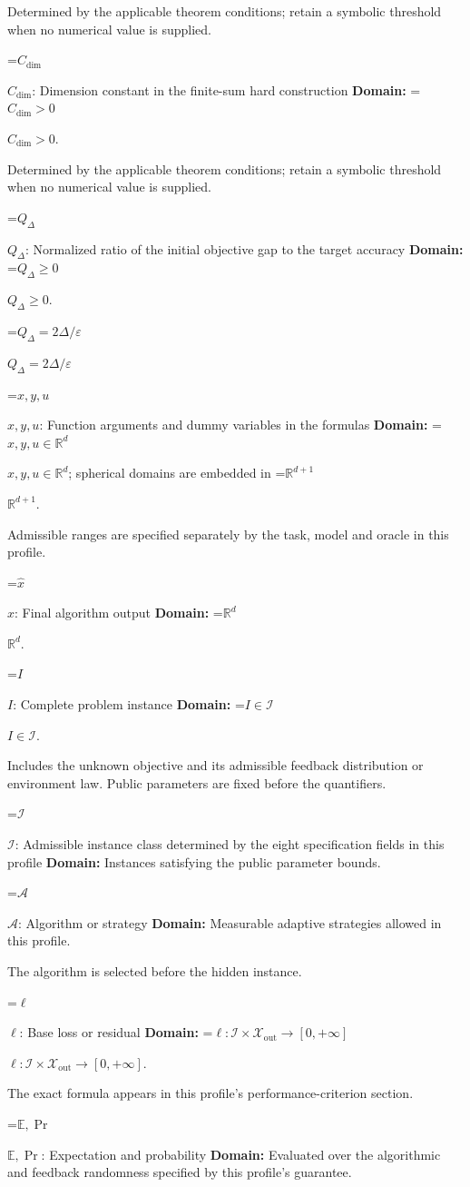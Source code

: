 \documentclass[10pt,a4paper]{article}
\newcommand{\AtlasMath}[1]{\par\begingroup\centering\setbox0=\hbox{$\displaystyle #1$}\ifdim\wd0>1.4\linewidth\typeout{ATLAS WIDE FORMULA: \the\wd0}\fi\ifdim\wd0>\linewidth\resizebox{\linewidth}{!}{\box0}\else\box0\fi\par\endgroup}
\newcommand{\AtlasInlineMath}[1]{\begingroup\setbox0=\hbox{$#1$}\ifdim\wd0>.4\linewidth\endgroup\AtlasMath{#1}\else\endgroup$#1$\fi}
\begin{document}
Determined by the applicable theorem conditions; retain a symbolic threshold when no numerical value is supplied.

\AtlasInlineMath{C_{\mathrm{dim}}}: Dimension constant in the finite-sum hard construction \textbf{Domain:} \AtlasInlineMath{C_{\mathrm{dim}}>0}.

Determined by the applicable theorem conditions; retain a symbolic threshold when no numerical value is supplied.

\AtlasInlineMath{Q_\Delta}: Normalized ratio of the initial objective gap to the target accuracy \textbf{Domain:} \AtlasInlineMath{Q_\Delta\ge0}.

\AtlasInlineMath{Q_\Delta=2\Delta/\varepsilon}

\AtlasInlineMath{x,y,u}: Function arguments and dummy variables in the formulas \textbf{Domain:} \AtlasInlineMath{x,y,u\in\mathbb{R}^d}; spherical domains are embedded in \AtlasInlineMath{\mathbb{R}^{d+1}}.

Admissible ranges are specified separately by the task, model and oracle in this profile.

\AtlasInlineMath{\widehat{x}}: Final algorithm output \textbf{Domain:} \AtlasInlineMath{\mathbb{R}^d}.

\AtlasInlineMath{I}: Complete problem instance \textbf{Domain:} \AtlasInlineMath{I\in\mathcal{I}}.

Includes the unknown objective and its admissible feedback distribution or environment law. Public parameters are fixed before the quantifiers.

\AtlasInlineMath{\mathcal{I}}: Admissible instance class determined by the eight specification fields in this profile \textbf{Domain:} Instances satisfying the public parameter bounds.

\AtlasInlineMath{\mathcal{A}}: Algorithm or strategy \textbf{Domain:} Measurable adaptive strategies allowed in this profile.

The algorithm is selected before the hidden instance.

\AtlasInlineMath{\ell}: Base loss or residual \textbf{Domain:} \AtlasInlineMath{\ell:\mathcal{I}\times\mathcal{X}_{\mathrm{out}}\to[0,+\infty]}.

The exact formula appears in this profile's performance-criterion section.

\AtlasInlineMath{\mathbb{E},\Pr}: Expectation and probability \textbf{Domain:} Evaluated over the algorithmic and feedback randomness specified by this profile's guarantee.
\end{document}
